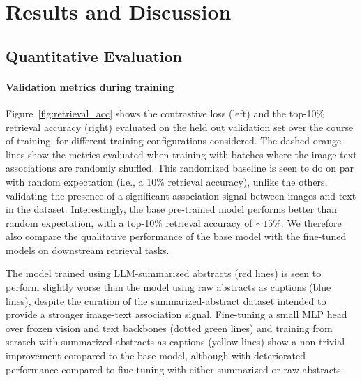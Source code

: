 \documentclass[10pt]{article} %
\begin{document}
\section{Results and Discussion}
\label{sec:results}

\subsection{Quantitative Evaluation}

\paragraph*{Validation metrics during training}

Figure~\ref{fig:retrieval_acc} shows the contrastive loss (left) and the top-10\% retrieval accuracy (right) evaluated on the held out validation set over the course of training, for different training configurations considered.
%
The dashed orange lines show the metrics evaluated when training with batches where the image-text associations are randomly shuffled.
%
This randomized baseline is seen to do on par with random expectation (i.e., a 10\% retrieval accuracy), unlike the others, validating the presence of a significant association signal between images and text in the dataset.
%
Interestingly, the base pre-trained model performs better than random expectation, with a top-10\% retrieval accuracy of $\sim 15\%$.
%
We therefore also compare the qualitative performance of the base model with the fine-tuned models on downstream retrieval tasks.

The model trained using LLM-summarized abstracts (red lines) is seen to perform slightly worse than the model using raw abstracts as captions (blue lines), despite the curation of the summarized-abstract dataset intended to provide a stronger image-text association signal.
%
Fine-tuning a small MLP head over frozen vision and text backbones (dotted green lines) and training from scratch with summarized abstracts as captions (yellow lines) show a non-trivial improvement compared to the base model, although with deteriorated performance compared to fine-tuning with either summarized or raw abstracts.
\end{document}
